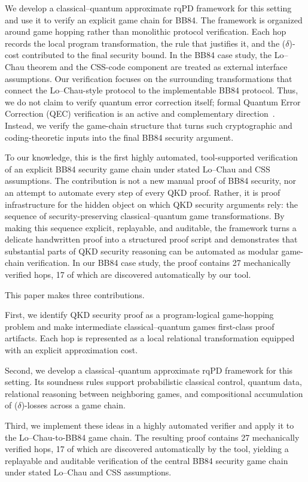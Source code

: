 \documentclass[conference,compsoc]{IEEEtran}
\newcommand{\bb}{\textsf{BB84}\xspace}
\begin{document}
We develop a classical--quantum approximate rqPD framework for this setting and use it to verify an explicit game chain for \bb. The framework is organized around game hopping rather than monolithic protocol verification. Each hop records the local program transformation, the rule that justifies it, and the ($\delta$)-cost contributed to the final security bound. In the \bb case study, the Lo--Chau theorem and the CSS-code component are treated as external interface assumptions. Our verification focuses on the surrounding transformations that connect the Lo--Chau-style protocol to the implementable \bb protocol. Thus, we do not claim to verify quantum error correction itself; formal Quantum Error Correction (QEC) verification is an active and complementary direction~\cite{huang2025veriqec,feng2025stabilizercoq}. Instead, we verify the game-chain structure that turns such cryptographic and coding-theoretic inputs into the final \bb security argument.

To our knowledge, this is the first highly automated, tool-supported verification of an explicit \bb security game chain under stated Lo--Chau and CSS assumptions. The contribution is not a new manual proof of \bb security, nor an attempt to automate every step of every QKD proof. Rather, it is proof infrastructure for the hidden object on which QKD security arguments rely: the sequence of security-preserving classical--quantum game transformations. By making this sequence explicit, replayable, and auditable, the framework turns a delicate handwritten proof into a structured proof script and demonstrates that substantial parts of QKD security reasoning can be automated as modular game-chain verification. In our \bb case study, the proof contains 27 mechanically verified hops, 17 of which are discovered automatically by our tool.

This paper makes three contributions.

First, we identify QKD security proof as a program-logical game-hopping problem and make intermediate classical--quantum games first-class proof artifacts. Each hop is represented as a local relational transformation equipped with an explicit approximation cost.

Second, we develop a classical--quantum approximate rqPD framework for this setting. Its soundness rules support probabilistic classical control, quantum data, relational reasoning between neighboring games, and compositional accumulation of ($\delta$)-losses across a game chain.

Third, we implement these ideas in a highly automated verifier and apply it to the Lo--Chau-to-\bb game chain. The resulting proof contains 27 mechanically verified hops, 17 of which are discovered automatically by the tool, yielding a replayable and auditable verification of the central \bb security game chain under stated Lo--Chau and CSS assumptions.
\end{document}
